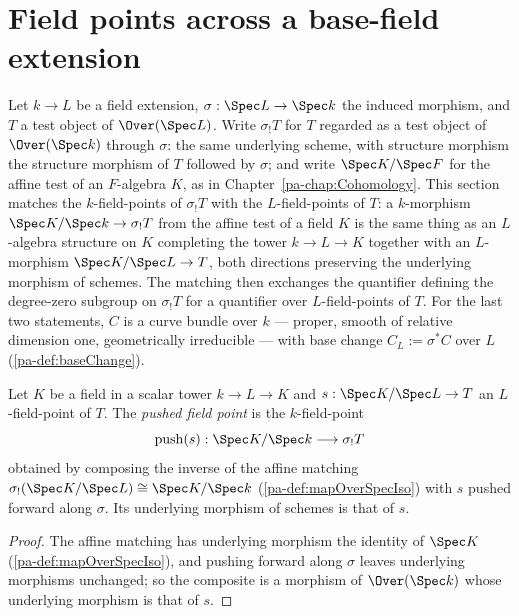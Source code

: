 \section{Field points across a base-field extension}
\label{pa-sec:fieldPointMatching}

Let \(k \to L\) be a field extension, \(\sigma : \Spec L \to \Spec k\) the induced
morphism, and \(T\) a test object of \(\Over(\Spec L)\). Write \(\sigma_{!}T\) for
\(T\) regarded as a test object of \(\Over(\Spec k)\) through \(\sigma\): the same
underlying scheme, with structure morphism the structure morphism of \(T\) followed by
\(\sigma\); and write \(\Spec K/\Spec F\) for the affine test of an \(F\)-algebra
\(K\), as in Chapter~\ref{pa-chap:Cohomology}. This section matches the
\(k\)-field-points of \(\sigma_{!}T\) with the \(L\)-field-points of \(T\): a
\(k\)-morphism \(\Spec K/\Spec k \to \sigma_{!}T\) from the affine test of a field
\(K\) is the same thing as an \(L\)-algebra structure on \(K\) completing the tower
\(k \to L \to K\) together with an \(L\)-morphism \(\Spec K/\Spec L \to T\), both
directions preserving the underlying morphism of schemes. The matching then exchanges
the quantifier defining the degree-zero subgroup on \(\sigma_{!}T\) for a quantifier
over \(L\)-field-points of \(T\). For the last two statements, \(C\) is a curve bundle
over \(k\) --- proper, smooth of relative dimension one, geometrically irreducible ---
with base change \(C_L := \sigma^{*}C\) over \(L\) (\ref{pa-def:baseChange}).

\begin{definition}
  \label{pa-def:pushFieldPoint}
  \leanok

  Let \(K\) be a field in a scalar tower \(k \to L \to K\) and
  \(s : \Spec K/\Spec L \to T\) an \(L\)-field-point of \(T\). The \emph{pushed field
  point} is the \(k\)-field-point
  \[
    \mathrm{push}(s) : \Spec K/\Spec k \longrightarrow \sigma_{!}T
  \]
  obtained by composing the inverse of the affine matching
  \(\sigma_{!}(\Spec K/\Spec L) \cong \Spec K/\Spec k\) (\ref{pa-def:mapOverSpecIso}) with
  \(s\) pushed forward along \(\sigma\). Its underlying morphism of schemes is that of
  \(s\).
\end{definition}
\begin{proof}
  \leanok
  The affine matching has underlying morphism the identity of \(\Spec K\)
  (\ref{pa-def:mapOverSpecIso}), and pushing forward along \(\sigma\) leaves underlying
  morphisms unchanged; so the composite is a morphism of \(\Over(\Spec k)\) whose
  underlying morphism is that of \(s\).
\end{proof}

